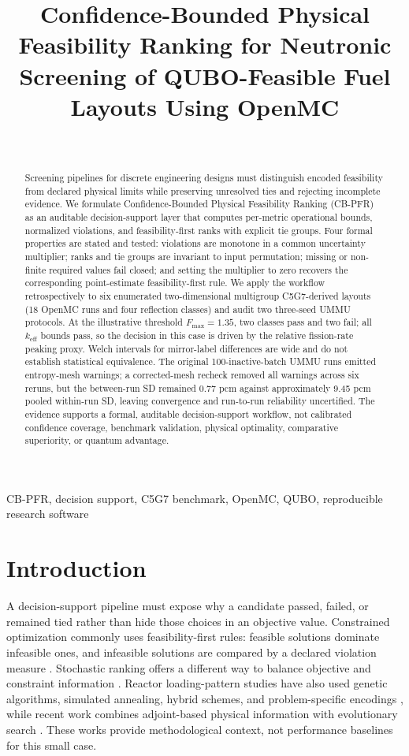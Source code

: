 \documentclass[conference]{IEEEtran}
\title{Confidence-Bounded Physical Feasibility Ranking for Neutronic Screening of QUBO-Feasible Fuel Layouts Using OpenMC}
\author{\IEEEauthorblockN{Anonymous Authors}\\
\IEEEauthorblockA{Affiliations withheld for double-blind review}}
\begin{document}
\maketitle

\begin{abstract}
Screening pipelines for discrete engineering designs must distinguish encoded feasibility from declared physical limits while preserving unresolved ties and rejecting incomplete evidence. We formulate Confidence-Bounded Physical Feasibility Ranking (CB-PFR) as an auditable decision-support layer that computes per-metric operational bounds, normalized violations, and feasibility-first ranks with explicit tie groups. Four formal properties are stated and tested: violations are monotone in a common uncertainty multiplier; ranks and tie groups are invariant to input permutation; missing or non-finite required values fail closed; and setting the multiplier to zero recovers the corresponding point-estimate feasibility-first rule. We apply the workflow retrospectively to six enumerated two-dimensional multigroup C5G7-derived layouts (18 OpenMC runs and four reflection classes) and audit two three-seed UMMU protocols. At the illustrative threshold $F_{\max}=1.35$, two classes pass and two fail; all $k_{\mathrm{eff}}$ bounds pass, so the decision in this case is driven by the relative fission-rate peaking proxy. Welch intervals for mirror-label differences are wide and do not establish statistical equivalence. The original 100-inactive-batch UMMU runs emitted entropy-mesh warnings; a corrected-mesh recheck removed all warnings across six reruns, but the between-run SD remained 0.77 pcm against approximately 9.45 pcm pooled within-run SD, leaving convergence and run-to-run reliability uncertified. The evidence supports a formal, auditable decision-support workflow, not calibrated confidence coverage, benchmark validation, physical optimality, comparative superiority, or quantum advantage.
\end{abstract}

\begin{IEEEkeywords}
CB-PFR, decision support, C5G7 benchmark, OpenMC, QUBO, reproducible research software
\end{IEEEkeywords}

\section{Introduction}
A decision-support pipeline must expose why a candidate passed, failed, or remained tied rather than hide those choices in an objective value. Constrained optimization commonly uses feasibility-first rules: feasible solutions dominate infeasible ones, and infeasible solutions are compared by a declared violation measure \cite{deb2000}. Stochastic ranking offers a different way to balance objective and constraint information \cite{runarsson2000}. Reactor loading-pattern studies have also used genetic algorithms, simulated annealing, hybrid schemes, and problem-specific encodings \cite{chapot1999,wu2001,erdogan2003,zameer2014,sobolev2017}, while recent work combines adjoint-based physical information with evolutionary search \cite{abuzlf2025}. These works provide methodological context, not performance baselines for this small case.
\end{document}

